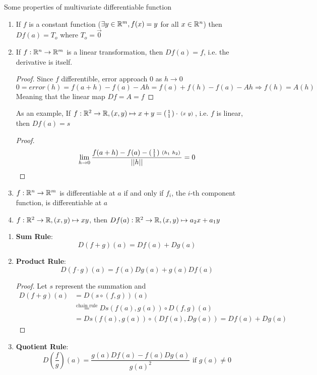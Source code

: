 \documentclass[11pt]{article}
\begin{document}
\begin{defn}
  Some properties of multivariate differentiable function
  \begin{enumerate}
      \item If $f$ is a constant function ($\exists y\in\mathbb{R}^m, f(x)=y$ for all $x\in\mathbb{R}^n$) then $Df(a) = T_o$ where $T_o = \vec{0}$
      \item If $f:\mathbb{R}^n \to\mathbb{R}^m$ is a linear transformation, then $Df(a) = f$, i.e. the derivative is itself.
      \begin{proof}
        Since $f$ differentible, error approach 0 as $h\to 0$
        \[
          0 = error(h) = f(a+h)-f(a)-Ah = f(a) + f(h) - f(a) - Ah \Rightarrow f(h) = A(h)
        \]
        Meaning that the linear map $Df = A = f$
      \end{proof}
      As an example, If $f:\mathbb{R}^2\to\mathbb{R}, (x,y)\mapsto x+y = \left(\begin{smallmatrix}1\\1\end{smallmatrix}\right)\cdot \begin{smallmatrix}(x&y)\end{smallmatrix}$, i.e. $f$ is linear, then $Df(a) = s$
      \begin{proof}
        \[
          \lim_{h\to0}\frac{f(a+h)- f(a) - \left(\begin{smallmatrix}1\\1\end{smallmatrix}\right)\begin{smallmatrix}(h_1&h_2)\end{smallmatrix}}{||h||} = 0
        \]
      \end{proof}
      \item $f: \mathbb{R}^n\to\mathbb{R}^m$ is differentiable at $a$ if and only if $f_i$, the $i$-th component function, is differentiable at $a$
      \item $f:\mathbb{R}^2\to\mathbb{R}, (x,y)\mapsto xy$, then $Df(a): \mathbb{R}^2\to\mathbb{R}, (x,y) \mapsto a_2x + a_1y$
  \end{enumerate}
\end{defn}

\begin{theorem}
  \label{sum, product, quotient rule}
  \begin{enumerate}
    Let $f,g: \R^n \to \R$, then
    \item \textbf{Sum Rule}:
    \[
      D(f+g)(a) = Df(a) + Dg(a)
    \]
    \item \textbf{Product Rule}:
    \[
      D(f\cdot g)(a) = f(a)Dg(a) + g(a)Df(a)
    \]
    \begin{proof}
      Let $s$ represent the summation and
      \begin{align*}
        D(f+g)(a) &= D(s\circ(f,g))(a)\\
        &\stackrel{\text{chain rule}}{=} Ds(f(a), g(a)) \circ D(f,g)(a) \\
        &= Ds(f(a), g(a)) \circ (Df(a), Dg(a)) = Df(a) + Dg(a)
      \end{align*}
    \end{proof}
    \item \textbf{Quotient Rule}:
    \[
      D(\frac{f}{g})(a) = \frac{g(a)Df(a) - f(a)Dg(a)}{g(a)^2} \text{ if } g(a)\neq 0
    \]
  \end{enumerate}

\end{theorem}
\end{document}
